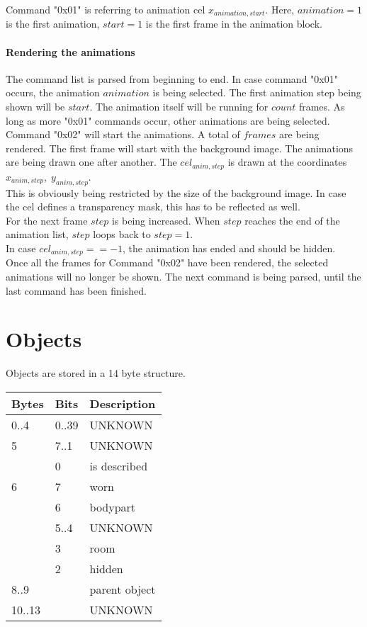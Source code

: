\documentclass[11pt,twoside,openright]{report}
\begin{document}
Command "0x01" is referring to animation cel $x_{animation,start}$. Here, $animation=1$ is the first animation, $start=1$ is the first frame in the animation block.\\

\subsubsection{Rendering the animations}
The command list is parsed from beginning to end. In case command "0x01" occurs, the animation $animation$ is being selected. The first animation step being shown will be $start$. The animation itself will be running for $count$ frames. As long as more "0x01" commands occur, other animations are being selected.\\
Command "0x02" will start the animations. A total of $frames$ are being rendered. The first frame will start with the background image. The animations are being drawn one after another. The $cel_{anim,step}$ is drawn at the coordinates $x_{anim,step},\;y_{anim,step}$.\\
This is obviously being restricted by the size of the background image. In case the cel defines a transparency mask, this has to be reflected as well. \\
For the next frame $step$ is being increased. When $step$ reaches the end of the animation list, $step$ loops back to $step=1$.\\
In case $cel_{anim,step}==-1$, the animation has ended and should be hidden.\\

Once all the frames for Command "0x02" have been rendered, the selected animations will no longer be shown. The next command is being parsed, until the last command has been finished.\\

\chapter{Objects}
Objects are stored in a 14 byte structure. \\
\begin{tabular}{l|l|l}
Bytes&Bits&Description\\\hline
0..4&0..39&UNKNOWN\\
5&7..1&UNKNOWN\\
&0&is described\\
6&7&worn\\
&6&bodypart\\
&5..4&UNKNOWN\\
&3&room\\
&2&hidden\\
8..9&&parent object\\
10..13&&UNKNOWN\\
\end{tabular}
\end{document}
